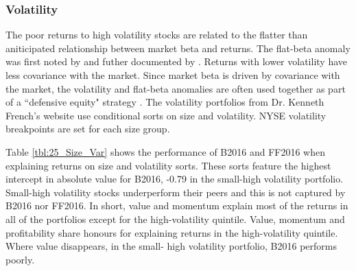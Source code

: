 
\subsubsection{Volatility}

\restoregeometry

The poor returns to high volatility stocks are related to the flatter than aniticipated
relationship between market beta and returns. The flat-beta anomaly was first noted by
\textcite{jensen1972capital} and futher documented by \textcite{fama1973risk}. Returns
with lower volatility have less covariance with the market. Since market beta is driven by
covariance with the market, the volatility and flat-beta anomalies are often used together
as part of a ``defensive equity" strategy \parencite{frazzini2014betting}. The volatility
portfolios from Dr. Kenneth French's website use conditional sorts on size and volatility.
NYSE volatility breakpoints are set for each size group.

Table \ref{tbl:25_Size_Var} shows the performance of B2016 and FF2016 when explaining
returns on size and volatility sorts. These sorts feature the highest intercept in
absolute value for B2016, -0.79 in the small-high volatility portfolio. Small-high
volatility stocks underperform their peers and this is not captured by B2016 nor FF2016.
In short, value and momentum explain most of the returns in all of the portfolios except
for the high-volatility quintile. Value, momentum and profitability share honours for
explaining returns in the high-volatility quintile. Where value disappears, in the small-
high volatility portfolio, B2016 performs poorly.

